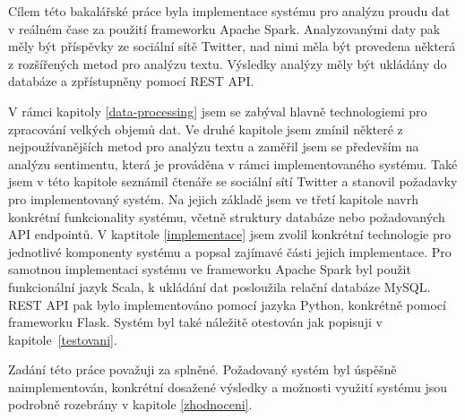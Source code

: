\documentclass[thesis=B,czech]{FITthesis}[2012/06/26]
\begin{document}
\begin{conclusion}
	Cílem této bakalářské práce byla implementace systému pro analýzu proudu dat v reálném čase za použití frameworku Apache Spark. Analyzovanými daty pak měly být příspěvky ze sociální sítě Twitter, nad nimi měla být provedena některá z rozšířených metod pro analýzu textu. Výsledky analýzy měly být ukládány do databáze a zpřístupněny pomocí REST API. 
	
	V rámci kapitoly \ref{data-processing} jsem se zabýval hlavně technologiemi pro zpracování velkých objemů dat. Ve druhé kapitole jsem zmínil některé z nejpoužívanějších metod pro analýzu textu a zaměřil jsem se především na analýzu sentimentu, která je prováděna v rámci implementovaného systému. Také jsem v této kapitole seznámil čtenáře se sociální sítí Twitter a stanovil požadavky pro implementovaný systém. Na jejich základě jsem ve třetí kapitole navrh konkrétní funkcionality systému, včetně struktury databáze nebo požadovaných API endpointů. V kaptitole \ref{implementace} jsem zvolil konkrétní technologie pro jednotlivé komponenty systému a popsal zajímavé části jejich implementace. Pro samotnou implementaci systému ve frameworku Apache Spark byl použit funkcionální  jazyk Scala, k ukládání dat posloužila relační databáze MySQL. REST API pak bylo implementováno pomocí jazyka Python, konkrétně pomocí frameworku Flask. Systém byl také náležitě otestován jak popisuji v kapitole~\ref{testovani}. 
	
	Zadání této práce považuji za splněné. Požadovaný systém byl úspěšně naimplementován, konkrétní dosažené výsledky a možnosti využití systému jsou podrobně rozebrány v kapitole \ref{zhodnoceni}. 
\end{conclusion}
\end{document}
